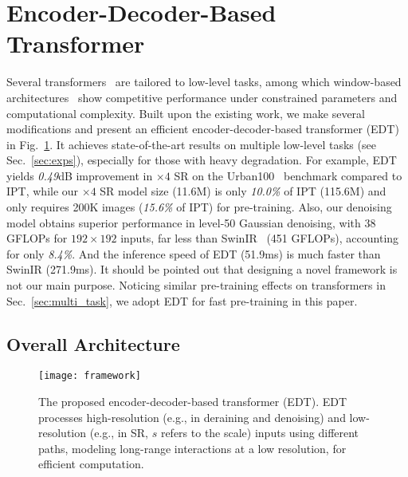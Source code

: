 \documentclass[runningheads]{llncs}
\makeatletter
\newcommand*{\eg}{e.g.\@\xspace}
\makeatother
\begin{document}
	\section{Encoder-Decoder-Based Transformer}
	
	Several transformers~\cite{chen2021pre,liang2021swinir,wang2021uformer} are tailored to low-level tasks, among which window-based architectures~\cite{liang2021swinir,wang2021uformer} show competitive performance under constrained parameters and computational complexity. Built upon the existing work, we make several modifications and present an efficient encoder-decoder-based transformer (EDT) in Fig.~\ref{fig:framework}. It achieves state-of-the-art results on multiple low-level tasks (see Sec.~\ref{sec:exps}), especially for those with heavy degradation. For example, EDT yields \textit{0.49}dB improvement in $\times 4$ SR on the Urban100~\cite{huang2015single} benchmark compared to IPT, while our $\times 4$ SR model size (11.6M) is only \textit{10.0\%} of IPT (115.6M) and only requires 200K images (\textit{15.6\%} of IPT) for pre-training. Also, our denoising model obtains superior performance in level-50 Gaussian denoising, with 38 GFLOPs for $192 \times 192$ inputs, far less than SwinIR~\cite{liang2021swinir} (451 GFLOPs), accounting for only \textit{8.4\%}. And the inference speed of EDT (51.9ms) is much faster than SwinIR (271.9ms). It should be pointed out that designing a novel framework is not our main purpose. Noticing similar pre-training effects on transformers in Sec.~\ref{sec:multi_task}, we adopt EDT for fast pre-training in this paper. 

	\subsection{Overall Architecture}
	
	\begin{figure}[t]
		\begin{center}
			\texttt{[image: framework]}
		\end{center}
		\vspace{-0.2in}
		\caption{The proposed encoder-decoder-based transformer (EDT). EDT processes high-resolution (\eg, in deraining and denoising) and low-resolution (\eg, in SR, $s$ refers to the scale) inputs using different paths, modeling long-range interactions at a low resolution, for efficient computation.} \label{fig:framework}
		\vspace{-0.1in}
	\end{figure}
	
\end{document}
